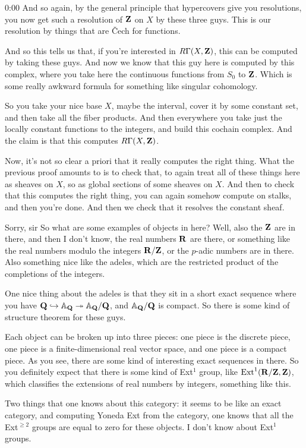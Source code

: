 \begin{unfinished}{0:00}
And so again, by the general principle that hypercovers give you resolutions, you now get such a resolution of $\mathbf Z$ on $X$ by these three guys. This is our resolution by things that are Čech for functions.

And so this tells us that, if you're interested in $R\Gamma(X, \mathbf Z)$, this can be computed by taking these guys. And now we know that this guy here is computed by this complex, where you take here the continuous functions from $S_0$ to $\mathbf Z$. Which is some really awkward formula for something like singular cohomology.

So you take your nice base $X$, maybe the interval, cover it by some constant set, and then take all the fiber products. And then everywhere you take just the locally constant functions to the integers, and build this cochain complex. And the claim is that this computes $R\Gamma(X, \mathbf Z)$. 

Now, it's not so clear a priori that it really computes the right thing. What the previous proof amounts to is to check that, to again treat all of these things here as sheaves on $X$, so as global sections of some sheaves on $X$. And then to check that this computes the right thing, you can again somehow compute on stalks, and then you're done. And then we check that it resolves the constant sheaf.

Sorry, sir
So what are some examples of objects in here? Well, also the $\mathbf Z$ are in there, and then I don't know, the real numbers $\mathbf R$ are there, or something like the real numbers modulo the integers $\mathbf R/\mathbf Z$, or the $p$-adic numbers are in there. Also something nice like the adeles, which are the restricted product of the completions of the integers.

One nice thing about the adeles is that they sit in a short exact sequence where you have $\mathbf Q\hookrightarrow\mathbb{A}_\mathbf Q\twoheadrightarrow\mathbb{A}_\mathbf Q/\mathbf Q$, and $\mathbb{A}_\mathbf Q/\mathbf Q$ is compact. So there is some kind of structure theorem for these guys.

Each object can be broken up into three pieces: one piece is the discrete piece, one piece is a finite-dimensional real vector space, and one piece is a compact piece. As you see, there are some kind of interesting exact sequences in there. So you definitely expect that there is some kind of Ext$^1$ group, like $\operatorname{Ext}^1(\mathbf R/\mathbf Z,\mathbf Z)$, which classifies the extensions of real numbers by integers, something like this.

Two things that one knows about this category: it seems to be like an exact category, and computing Yoneda Ext from the category, one knows that all the Ext$^{\ge 2}$ groups are equal to zero for these objects. I don't know about Ext$^1$ groups.


\end{unfinished}
